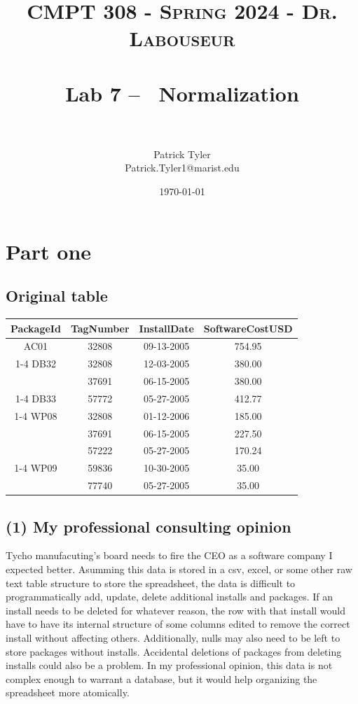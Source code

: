 \documentclass[letterpaper, 10pt]{article}
\title{	
   \normalfont \normalsize 
   \textsc{CMPT 308 - Spring 2024 - Dr. Labouseur} \\[10pt] %
   \horrule{0.5pt} \\[0.25cm] 	%
   \huge Lab 7 -- ~Normalization \\     	    %
   \horrule{0.5pt} \\[0.25cm] 	%
}
\author{Patrick Tyler \\ \normalsize Patrick.Tyler1@marist.edu}
\date{\normalsize\today} 	%
\begin{document}
\maketitle %


\section{Part one}
\subsection{Original table}
\begin{table}[h]
\centering
\begin{tabular}{|c|c|c|c|}
\hline
PackageId & TagNumber & InstallDate & SoftwareCostUSD \\
\hline
AC01 & 32808 & 09-13-2005 & 754.95 \\
\cline{1-4}
DB32 & 32808 & 12-03-2005 & 380.00 \\
     & 37691 & 06-15-2005 & 380.00 \\
\cline{1-4}
DB33 & 57772 & 05-27-2005 & 412.77 \\
\cline{1-4}
WP08 & 32808 & 01-12-2006 & 185.00 \\
     & 37691 & 06-15-2005 & 227.50 \\
     & 57222 & 05-27-2005 & 170.24 \\
\cline{1-4}
WP09 & 59836 & 10-30-2005 & 35.00 \\
     & 77740 & 05-27-2005 & 35.00 \\
\hline
\end{tabular}
\end{table}
\subsection{(1) My professional consulting opinion}
Tycho manufacuting's board needs to fire the CEO 
    as a software company I expected better. 
Asumming this data is stored in a csv, excel, or some
    other raw text table structure to store the spreadsheet,
    the data is difficult to programmatically add, update, delete
    additional installs and packages.
If an install needs to be deleted for whatever reason, the
    row with that install would have to have its internal structure
    of some columns edited to remove the correct install 
    without affecting others.
Additionally, nulls may also need to be left to store packages
    without installs.
Accidental deletions of packages from deleting installs could 
    also be a problem.
In my professional opinion, this data is not complex enough
    to warrant a database, but it would help organizing
    the spreadsheet more atomically.
\end{document}
